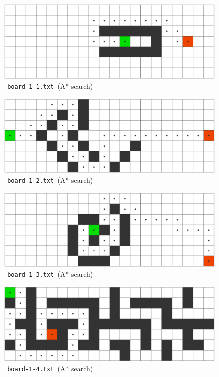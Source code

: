 \begin{figure}[H]
\includegraphics[width=\textwidth]{images/board-1-1}
\caption{\texttt{~board-1-1.txt~}(A* search)}
\end{figure}

\begin{figure}[H]
\includegraphics[width=\textwidth]{images/board-1-2}
\caption{\texttt{~board-1-2.txt~}(A* search)}
\end{figure}

\begin{figure}[H]
\includegraphics[width=\textwidth]{images/board-1-3}
\caption{\texttt{~board-1-3.txt~}(A* search)}
\end{figure}

\begin{figure}[H]
\includegraphics[width=\textwidth]{images/board-1-4}
\caption{\texttt{~board-1-4.txt~}(A* search)}
\end{figure}

